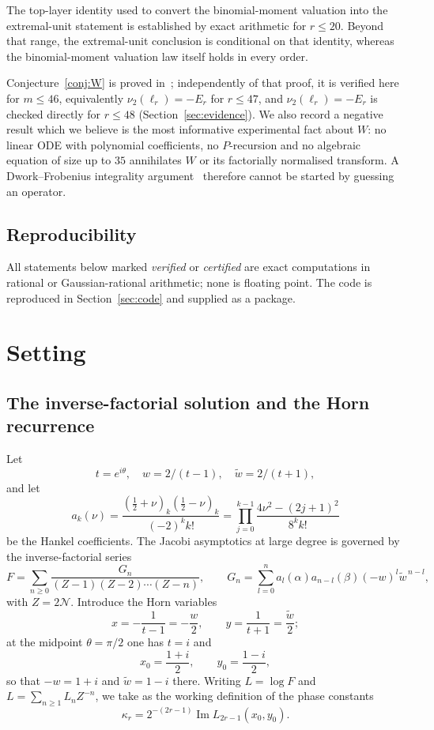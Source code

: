 \documentclass[10pt,a4paper]{amsart}
\newcommand{\Nn}{\mathcal N}
\begin{document}
The top-layer identity used to convert the binomial-moment valuation into the extremal-unit statement is established by exact arithmetic for $r\le20$. Beyond that range, the extremal-unit conclusion is conditional on that identity, whereas the binomial-moment valuation law itself holds in every order.

Conjecture~\ref{conj:W} is proved in~\cite{Ultraspherical}; independently of that proof, it is verified here for $m\le46$, equivalently $\nu_2(\ell_r)=-E_r$ for $r\le47$, and $\nu_2(\ell_r)=-E_r$ is checked directly for $r\le48$ (Section~\ref{sec:evidence}).  We also record a negative result which we believe is the most informative experimental fact about $W$: no linear ODE with polynomial coefficients, no $P$-recursion and no algebraic equation of size up to $35$ annihilates $W$ or its factorially normalised transform.  A Dwork--Frobenius integrality argument~\cite{Dwork,Nemoto}  therefore cannot be started by guessing an operator.

\subsection{Reproducibility}

All statements below marked \emph{verified} or \emph{certified} are exact computations in rational or Gaussian-rational arithmetic; none is floating point.  The code is reproduced in Section~\ref{sec:code} and supplied as a package.

\section{Setting}\label{sec:setting}

\subsection{The inverse-factorial solution and the Horn recurrence}

Let 
\[
t=e^{i\theta}, \quad w=2/(t-1), \quad \widetilde w=2/(t+1), 
\]
and let
\[
  a_k(\nu)=\frac{(\frac12+\nu)_k(\frac12-\nu)_k}{(-2)^kk!} =\prod_{j=0}^{k-1}\frac{4\nu^2-(2j+1)^2}{8^kk!}
\]
be the Hankel coefficients.  The Jacobi asymptotics at large degree is governed by the inverse-factorial series
\begin{equation}\label{eq:invfact}
  F=\sum_{n\ge0}\frac{G_n}{(Z-1)(Z-2)\cdots(Z-n)},\qquad   G_n=\sum_{l=0}^na_l(\alpha)a_{n-l}(\beta)(-w)^l\widetilde w^{\,n-l},
\end{equation}
with $Z=2\Nn$.  Introduce the Horn variables
\[
  x=-\frac1{t-1}=-\frac w2,\qquad y=\frac1{t+1}=\frac{\widetilde w}2 ;
\]
at the midpoint $\theta=\pi/2$ one has $t=i$ and
\[
  x_0=\frac{1+i}2,\qquad y_0=\frac{1-i}2 ,
\]
so that $-w=1+i$ and $\widetilde w=1-i$ there.  Writing $L=\log F$ and $L=\sum_{n\ge1}L_nZ^{-n}$, we take as the working definition of the phase constants
\begin{equation}\label{eq:kappafromL}
  \kappa_r=2^{-(2r-1)}\operatorname{Im}L_{2r-1}(x_0,y_0).
\end{equation}
\end{document}
